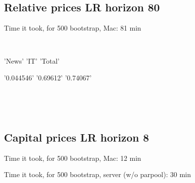 \documentclass{article}
\def \ourFigPath {../}
\begin{document}
         
         
         \

\begin{figure}[h!]
\centering
{} \hspace{.2in%
} 
\end{figure}


\newpage
\subsection{Relative prices LR horizon 80}
	\noindent Time it took, for 500 bootstrap, Mac: 81 min
	
	\
	
	\noindent  'News'       'IT'        'Total' 
	
         \noindent  '0.044546'    '0.69612'    '0.74067'
         
         \
         
         
         
         \

\begin{figure}[h!]
\centering
{} \hspace{.2in%
} 
\end{figure}
 



        
\newpage
	\subsection{Capital prices LR horizon 8}
	\noindent Time it took, for 500 bootstrap, Mac: 12 min
	
	\noindent  Time it took, for 500 bootstrap, server (w/o parpool): 30 min
\end{document}
